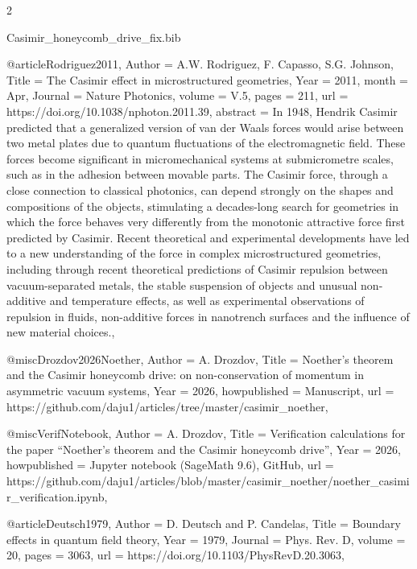 \documentclass[twoside, 10pt]{article}
\def\myfilename{Casimir_honeycomb_drive_fix}
\begin{document}
\begin{multicols}{2}
\begin{filecontents}{\myfilename.bib}


@article{Rodriguez2011,
    Author = {A.W. Rodriguez, F. Capasso, S.G. Johnson},
    Title = {The Casimir effect in microstructured geometries},
    Year = {2011},
    month = {Apr},
    Journal = {Nature Photonics},
    volume = {V.5},
    pages = {211},
    url = {https://doi.org/10.1038/nphoton.2011.39},
    abstract = {In 1948, Hendrik Casimir predicted that a generalized version of van der Waals forces would arise between two metal plates due to quantum fluctuations of the electromagnetic field. These forces become significant in micromechanical systems at submicrometre scales, such as in the adhesion between movable parts. The Casimir force, through a close connection to classical photonics, can depend strongly on the shapes and compositions of the objects, stimulating a decades-long search for geometries in which the force behaves very differently from the monotonic attractive force first predicted by Casimir. Recent theoretical and experimental developments have led to a new understanding of the force in complex microstructured geometries, including through recent theoretical predictions of Casimir repulsion between vacuum-separated metals, the stable suspension of objects and unusual non-additive and temperature effects, as well as experimental observations of repulsion in fluids, non-additive forces in nanotrench surfaces and the influence of new material choices.},
}

@misc{Drozdov2026Noether,
    Author = {A. Drozdov},
    Title = {Noether's theorem and the Casimir honeycomb drive: on non-conservation of momentum in asymmetric vacuum systems},
    Year = {2026},
    howpublished = {Manuscript},
    url = {https://github.com/daju1/articles/tree/master/casimir_noether},
}

@misc{VerifNotebook,
    Author = {A. Drozdov},
    Title = {Verification calculations for the paper ``Noether's theorem and the Casimir honeycomb drive''},
    Year = {2026},
    howpublished = {Jupyter notebook (SageMath 9.6), GitHub},
    url = {https://github.com/daju1/articles/blob/master/casimir_noether/noether_casimir_verification.ipynb},
}

@article{Deutsch1979,
    Author = {D. Deutsch and P. Candelas},
    Title = {Boundary effects in quantum field theory},
    Year = {1979},
    Journal = {Phys. Rev. D},
    volume = {20},
    pages = {3063},
    url = {https://doi.org/10.1103/PhysRevD.20.3063},
}


\end{filecontents}
\end{multicols}
\end{document}
